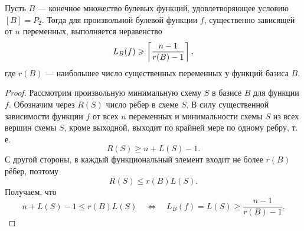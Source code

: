 \begin{theorem}
    Пусть $B$ --- конечное множество булевых функций, удовлетворяющее условию $[B] = P_2$. Тогда для произвольной булевой функции $f$, существенно зависящей от $n$ переменных, выполняется неравенство
    \[
        L_B(f) \geqslant \left\lceil {\frac{n-1}{r(B) - 1}} \right\rceil,
    \]
    где $r(B)$ --- наибольшее число существенных переменных у функций базиса $B$.
\end{theorem}

\begin{proof}
    Рассмотрим произвольную минимальную схему $S$ в базисе $B$ для функции $f$. Обозначим через $R(S)$ число рёбер в схеме $S$. В силу существенной зависимости функции $f$ от всех $n$ переменных и минимальности схемы $S$ из всех вершин схемы $S$, кроме выходной, выходит по крайней мере по одному ребру, т.\,е.
    \[
        R(S) \geqslant n + L(S) - 1.
    \]
    С другой стороны, в каждый функциональный элемент входит не более $r(B)$ рёбер, поэтому
    \[
        R(S)\leqslant r(B) L(S).
    \]
    Получаем, что
    \[
        n + L(S) - 1 \leqslant r(B)L(S) \quad \Longleftrightarrow \quad L_B(f) = L(S) \geqslant \frac{n-1}{r(B) - 1}.
    \]
\end{proof}